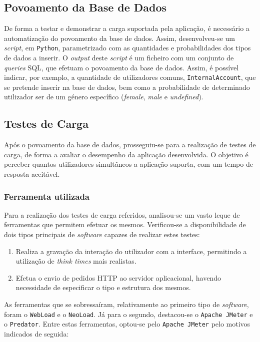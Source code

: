 \subsection{Povoamento da Base de Dados}

De forma a testar e demonstrar a carga suportada pela aplicação, é necessário a automatização do povoamento da base de dados. Assim, desenvolveu-se um \textit{script}, em \texttt{Python}, parametrizado com as quantidades e probabilidades dos tipos de dados a inserir. O \textit{output} deste \textit{script} é um ficheiro com um conjunto de \textit{queries} SQL, que efetuam o povoamento da base de dados. Assim, é possível indicar, por exemplo, a quantidade de utilizadores comuns, \texttt{InternalAccount}, que se pretende inserir na base de dados, bem como a probabilidade de determinado utilizador ser de um género específico (\textit{female}, \textit{male} e \textit{undefined}).


\subsection{Testes de Carga}

Após o povoamento da base de dados, prosseguiu-se para a realização de testes de carga, de forma a avaliar o desempenho da aplicação desenvolvida. O objetivo é perceber quantos utilizadores simultâneos a aplicação suporta, com um tempo de resposta aceitável.

\subsubsection{Ferramenta utilizada}
\label{sec:ferramenta_utilizada}

Para a realização dos testes de carga referidos, analisou-se um vasto leque de ferramentas que permitem efetuar os mesmos. Verificou-se a disponibilidade de dois tipos principais de \textit{software} capazes de realizar estes testes:

\begin{enumerate}
    \item Realiza a gravação da interação do utilizador com a interface, permitindo a utilização de \textit{think times} mais realistas.
    \item Efetua o envio de pedidos HTTP ao servidor aplicacional, havendo necessidade de especificar o tipo e estrutura dos mesmos.
\end{enumerate}

As ferramentas que se sobressaíram, relativamente ao primeiro tipo de \textit{software}, foram o \texttt{WebLoad} e o \texttt{NeoLoad}. Já para o segundo, destacou-se o \texttt{Apache JMeter} e o \texttt{Predator}. Entre estas ferramentas, optou-se pelo \texttt{Apache JMeter} pelo motivos indicados de seguida:

